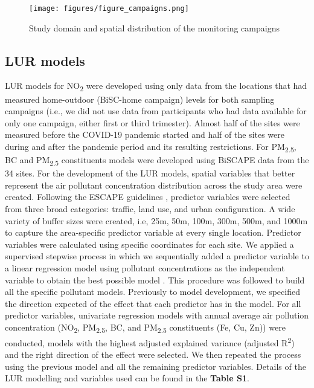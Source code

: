 \documentclass{article}
\begin{document}
\captionsetup[figure]{skip=0pt}
\begin{figure}[!htb]
\texttt{[image: figures/figure\_campaigns.png]}
\caption{Study domain and spatial distribution of the monitoring campaigns}
\label{fig1}
\end{figure}



\subsection{LUR models}

LUR models for NO\textsubscript{2} were developed using only data from the locations that had measured home-outdoor (BiSC-home campaign) levels for both sampling campaigns (i.e., we did not use data from participants who had data available for only one campaign, either first or third trimester). Almost half of the sites were measured before the COVID-19 pandemic started and half of the sites were during and after the pandemic period and its resulting restrictions. For PM\textsubscript{2.5}, BC  and PM\textsubscript{2.5} constituents models were developed using BiSCAPE data from the 34 sites. For the development of the LUR models, spatial variables that better represent the air pollutant concentration distribution across the study area were created. Following the ESCAPE guidelines \cite{eeftens2012, beelen2013},  predictor variables were selected from three broad categories: traffic, land use, and urban configuration. A wide variety of buffer sizes were created, i.e, 25m, 50m, 100m, 300m, 500m, and 1000m to capture the area-specific predictor variable at every single location. Predictor variables were calculated using specific coordinates for each site. We applied a supervised stepwise process in which we sequentially added a predictor variable to a linear regression model using pollutant concentrations as the independent variable to obtain the best possible model \cite{eeftens2012, beelen2013}. This procedure was followed to build all the specific pollutant models. Previously to model development, we specified the direction expected of the effect that each predictor has in the model. For all predictor variables, univariate regression models with annual average air pollution concentration (NO\textsubscript{2}, PM\textsubscript{2.5}, BC, and PM\textsubscript{2.5} constituents (Fe, Cu, Zn)) were conducted, models with the highest adjusted explained variance (adjusted R\textsuperscript{2}) and the right direction of the effect were selected. We then repeated the process using the previous model and all the remaining predictor variables. Details of the LUR modelling and variables used can be found in the \textbf{Table S1}.
\end{document}
